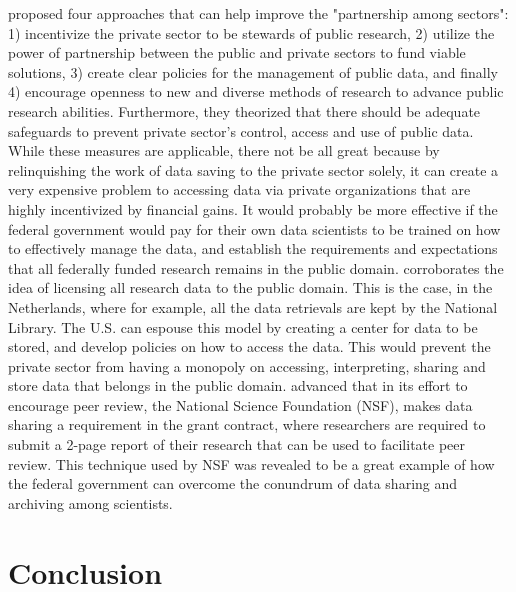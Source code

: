 \documentclass[sigconf]{acmart}
\begin{document}
\cite{berman2013will} proposed four approaches that can help improve the "partnership among sectors": 1) incentivize the private sector to be stewards of public research, 2) utilize the power of partnership between the public and private sectors to fund viable solutions, 3) create clear policies for the management of public data, and finally 4) encourage openness to new and diverse methods of research to advance public research abilities. Furthermore, they theorized that there should be adequate safeguards to prevent private sector’s control, access and use of public data. While these measures are applicable, there not be all great because by relinquishing the work of data saving to the private sector solely, it can create a very expensive problem to accessing data via private organizations that are highly incentivized by financial gains. It would probably be more effective if the federal government would pay for their own data scientists to be trained on how to effectively manage the data, and establish the requirements and expectations that all federally funded research remains in the public domain. 
\cite{sarkol2016scientific} corroborates the idea of licensing all research data to the public domain. This is the case, in the Netherlands, where for example, all the data retrievals are kept by the National Library. The U.S. can espouse this model by creating a center for data to be stored, and develop policies on how to access the data. This would prevent the private sector from having a monopoly on accessing, interpreting, sharing and store data that belongs in the public domain.  \cite{borgman2012conundrum} advanced that in its effort to encourage peer review, the National Science Foundation (NSF), makes data sharing a requirement in the grant contract, where researchers are required to submit a 2-page report of their research that can be used to facilitate peer review. This technique used by NSF was revealed to be a great example of how the federal government can overcome the conundrum of data sharing and archiving among scientists.


\section{Conclusion}
\end{document}
